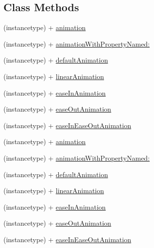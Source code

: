 \subsection*{Class Methods}
\begin{DoxyCompactItemize}
\item 
(instancetype) + \mbox{\hyperlink{interface_p_o_p_basic_animation_ae6cb5087195e47aa4fd9f615829cce4c}{animation}}
\item 
(instancetype) + \mbox{\hyperlink{interface_p_o_p_basic_animation_aa6332608f15c63f9ca6837fd595a2032}{animation\+With\+Property\+Named\+:}}
\item 
(instancetype) + \mbox{\hyperlink{interface_p_o_p_basic_animation_a93bf55b391828d3e76031be39bcdbd1f}{default\+Animation}}
\item 
(instancetype) + \mbox{\hyperlink{interface_p_o_p_basic_animation_a67906e9230c1e8a01d052d86445c9d1e}{linear\+Animation}}
\item 
(instancetype) + \mbox{\hyperlink{interface_p_o_p_basic_animation_a19baa1e60760e093db39511258f2a4fe}{ease\+In\+Animation}}
\item 
(instancetype) + \mbox{\hyperlink{interface_p_o_p_basic_animation_acc9d80c152ce8a12051fb83487bed541}{ease\+Out\+Animation}}
\item 
(instancetype) + \mbox{\hyperlink{interface_p_o_p_basic_animation_a13f8eb84a553d3c366fac03fd5b71adb}{ease\+In\+Ease\+Out\+Animation}}
\item 
(instancetype) + \mbox{\hyperlink{interface_p_o_p_basic_animation_ae6cb5087195e47aa4fd9f615829cce4c}{animation}}
\item 
(instancetype) + \mbox{\hyperlink{interface_p_o_p_basic_animation_aa6332608f15c63f9ca6837fd595a2032}{animation\+With\+Property\+Named\+:}}
\item 
(instancetype) + \mbox{\hyperlink{interface_p_o_p_basic_animation_a93bf55b391828d3e76031be39bcdbd1f}{default\+Animation}}
\item 
(instancetype) + \mbox{\hyperlink{interface_p_o_p_basic_animation_a67906e9230c1e8a01d052d86445c9d1e}{linear\+Animation}}
\item 
(instancetype) + \mbox{\hyperlink{interface_p_o_p_basic_animation_a19baa1e60760e093db39511258f2a4fe}{ease\+In\+Animation}}
\item 
(instancetype) + \mbox{\hyperlink{interface_p_o_p_basic_animation_acc9d80c152ce8a12051fb83487bed541}{ease\+Out\+Animation}}
\item 
(instancetype) + \mbox{\hyperlink{interface_p_o_p_basic_animation_a13f8eb84a553d3c366fac03fd5b71adb}{ease\+In\+Ease\+Out\+Animation}}

\end{DoxyCompactItemize}
